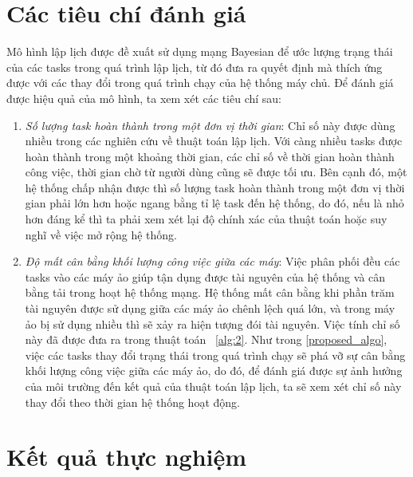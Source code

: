 \documentclass{my_style}
\begin{document}
\section{Các tiêu chí đánh giá}
Mô hình lập lịch được đề xuất sử dụng mạng Bayesian để ước lượng trạng thái của các tasks trong quá trình lập lịch, từ đó đưa ra quyết định mà thích ứng được với các thay đổi trong quá trình chạy của hệ thống máy chủ. Để đánh giá được hiệu quả của mô hình, ta xem xét các tiêu chí sau: 
\begin{enumerate}
	\item \textit{Số lượng task hoàn thành trong một đơn vị thời gian}: Chỉ số này được dùng nhiều trong các nghiên cứu về thuật toán lập lịch. Với càng nhiều tasks được hoàn thành trong một khoảng thời gian, các chỉ số về thời gian hoàn thành công việc, thời gian chờ từ người dùng cũng sẽ được tối ưu. Bên cạnh đó, một hệ thống chấp nhận được thì số lượng task hoàn thành trong một đơn vị thời gian phải lớn hơn hoặc ngang bằng tỉ lệ task đến hệ thống, do đó, nếu là nhỏ hơn đáng kể thì ta phải xem xét lại độ chính xác của thuật toán hoặc suy nghĩ về việc mở rộng hệ thống. 
	\item \textit{Độ mất cân bằng khối lượng công việc giữa các máy}: Việc phân phối đều các tasks vào các máy ảo giúp tận dụng được tài nguyên của hệ thống và cân bằng tải trong hoạt hệ thống mạng. Hệ thống mất cân bằng khi phần trăm tài nguyên được sử dụng giữa các máy ảo chênh lệch quá lớn, và trong máy ảo bị sử dụng nhiều thì sẽ xảy ra hiện tượng đói tài nguyên. Việc tính chỉ số này đã được đưa ra trong thuật toán ~\ref{alg:2}. Như trong \ref{proposed_algo}, việc các tasks thay đổi trạng thái trong quá trình chạy sẽ phá vỡ sự cân bằng khối lượng công việc giữa các máy ảo, do đó, để đánh giá được sự ảnh hưởng của môi trường đến kết quả của thuật toán lập lịch, ta sẽ xem xét chỉ số này thay đổi theo thời gian hệ thống hoạt động. 
\end{enumerate} 

\section{Kết quả thực nghiệm}
\end{document}
